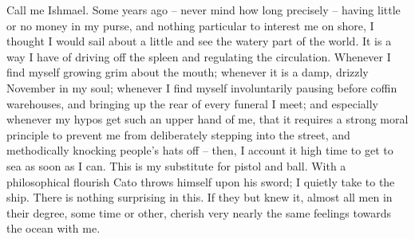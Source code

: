 \documentclass[english]{article}
\begin{document}
\fontsize{12bp}{14bp}\selectfont
{}
\noindent Call me Ishmael. Some years ago – never mind how long precisely – having
little or no money in my purse, and nothing particular to interest me on
shore, I thought I would sail about a little and see the watery part of
the world. It is a way I have of driving off the spleen and regulating
the circulation. Whenever I find myself growing grim about the mouth;
whenever it is a damp, drizzly November in my soul; whenever I find
myself involuntarily pausing before coffin warehouses, and bringing up
the rear of every funeral I meet; and especially whenever my hypos get
such an upper hand of me, that it requires a strong moral principle to
prevent me from deliberately stepping into the street, and methodically
knocking people’s hats off – then, I account it high time to get to
sea as soon as I can. This is my substitute for pistol and ball. With
a philosophical flourish Cato throws himself upon his sword; I quietly
take to the ship. There is nothing surprising in this. If they but knew
it, almost all men in their degree, some time or other, cherish very
nearly the same feelings towards the ocean with me.
\end{document}
